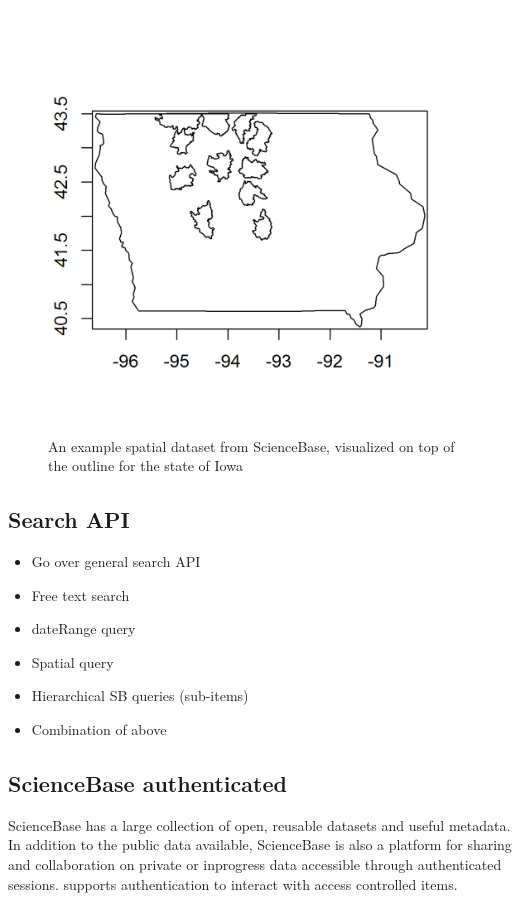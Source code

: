 \begin{figure}[htbp]
   \centering
   \includegraphics{mapfig}
   \caption{An example spatial dataset from ScienceBase, 
   visualized on top of the outline for the state of Iowa}
   \label{figure:iowafig}
 \end{figure}


\subsection{Search API}
\begin{itemize}
	\item{Go over general search API}
	\item{Free text search}
	\item{dateRange query}
	\item{Spatial query}
	\item{Hierarchical SB queries (sub-items)}
	\item{Combination of above}
\end{itemize}

\subsection{ScienceBase authenticated}
ScienceBase has a large collection of open, reusable datasets and 
useful metadata. In addition to the public data available, ScienceBase
is also a platform for sharing and collaboration on private or inprogress 
data accessible through authenticated sessions.  supports 
authentication to interact with access controlled items.

